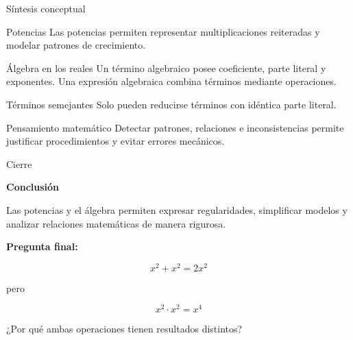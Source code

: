 \documentclass[handout,aspectratio=169]{beamer}
\begin{document}
	\begin{frame}{Síntesis conceptual}
		\begin{block}{Potencias}
			Las potencias permiten representar multiplicaciones reiteradas y modelar patrones de crecimiento.
		\end{block}
		
		\pause
		
		\begin{block}{Álgebra en los reales}
			Un término algebraico posee coeficiente, parte literal y exponentes.  
			Una expresión algebraica combina términos mediante operaciones.
		\end{block}
		
		\pause
		
		\begin{block}{Términos semejantes}
			Solo pueden reducirse términos con idéntica parte literal.
		\end{block}
		
		\pause
		
		\begin{block}{Pensamiento matemático}
			Detectar patrones, relaciones e inconsistencias permite justificar procedimientos y evitar errores mecánicos.
		\end{block}
	\end{frame}
	
	\begin{frame}{Cierre}
		\begin{center}
			{\Huge \textbf{Conclusión}}
			
			\vspace{0.5cm}
			
			\Large
			Las potencias y el álgebra permiten expresar regularidades, simplificar modelos y analizar relaciones matemáticas de manera rigurosa.
			
			\vspace{0.7cm}
			
			\textbf{Pregunta final:}
			
			\[
			x^2+x^2=2x^2
			\]
			
			pero
			
			\[
			x^2\cdot x^2=x^4
			\]
			
			\pause
			
			¿Por qué ambas operaciones tienen resultados distintos?
		\end{center}
	\end{frame}
	
\end{document}
